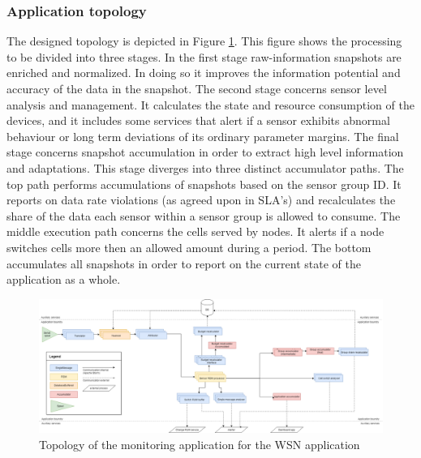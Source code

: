 \subsubsection{Application topology}
The designed topology is depicted in Figure \ref{fig:sensit_topology}. This figure shows the processing to be divided into three stages. In the first stage raw-information snapshots are enriched and normalized. In doing so it improves the information potential and accuracy of the data in the snapshot. The second stage concerns sensor level analysis and management. It calculates the state and resource consumption of the devices, and it includes some services that alert if a sensor exhibits abnormal behaviour or long term deviations of its ordinary parameter margins. The final stage concerns snapshot accumulation in order to extract high level information and adaptations. This stage diverges into three distinct accumulator paths. The top path performs accumulations of snapshots based on the sensor group ID. It reports on data rate violations (as agreed upon in SLA's) and recalculates the share of the data each sensor within a sensor group is allowed to consume. The middle execution path concerns the cells served by nodes. It alerts if a node switches cells more then an allowed amount during a period. The bottom accumulates all snapshots in order to report on the current state of the application as a whole.

\begin{figure}
\centering
\includegraphics[width=1.15\textwidth]{resources/img/sensit_topology.png}
\caption{Topology of the monitoring application for the \nedap\idsystems\sensit WSN application}
\label{fig:sensit_topology}
\end{figure}

